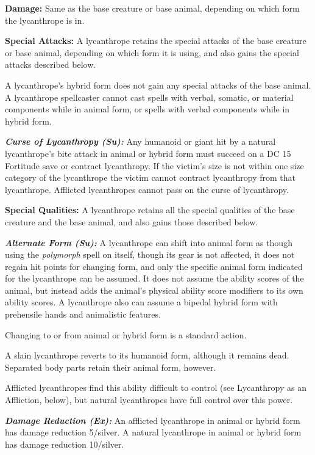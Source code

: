 \documentclass{article}
\begin{document}
\textbf{Damage:} Same as the base creature or base animal, depending on which form 
the lycanthrope is in.

\textbf{Special Attacks:} A lycanthrope retains the special attacks of the base 
creature or base animal, depending on which form it is using, and also gains the 
special attacks described below.

A lycanthrope's hybrid form does not gain any special attacks of the base animal. 
A lycanthrope spellcaster cannot cast spells with verbal, somatic, or material 
components while in animal form, or spells with verbal components while in hybrid 
form.

\textit{\textbf{Curse of Lycanthropy (Su):}}\textit{ }Any humanoid or giant hit 
by a natural lycanthrope's bite attack in animal or hybrid form must succeed on 
a DC 15 Fortitude save or contract lycanthropy. If the victim's size is not within 
one size category of the lycanthrope the victim cannot contract lycanthropy from 
that lycanthrope. Afflicted lycanthropes cannot pass on the curse of lycanthropy.

\textbf{Special Qualities:} A lycanthrope retains all the special qualities of 
the base creature and the base animal, and also gains those described below.

\textit{\textbf{Alternate Form (Su):}}\textit{ }A lycanthrope can shift into animal 
form as though using the \textit{polymorph }spell on itself, though its gear is 
not affected, it does not regain hit points for changing form, and only the specific 
animal form indicated for the lycanthrope can be assumed. It does not assume the 
ability scores of the animal, but instead adds the animal's physical ability score 
modifiers to its own ability scores. A lycanthrope also can assume a bipedal hybrid 
form with prehensile hands and animalistic features.

Changing to or from animal or hybrid form is a standard action.

A slain lycanthrope reverts to its humanoid form, although it remains dead. Separated 
body parts retain their animal form, however.

Afflicted lycanthropes find this ability difficult to control (see Lycanthropy 
as an Affliction, below), but natural lycanthropes have full control over this 
power.

\textit{\textbf{Damage Reduction (Ex): }}An afflicted lycanthrope in animal or 
hybrid form has damage reduction 5/silver. A natural lycanthrope in animal or hybrid 
form has damage reduction 10/silver.
\end{document}
